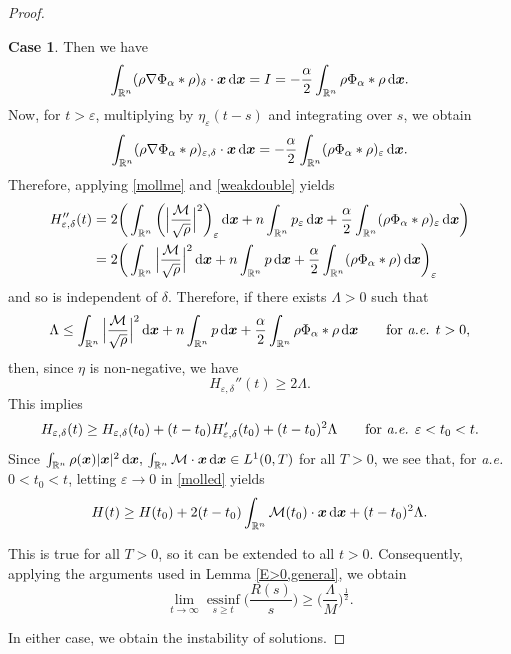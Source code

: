 \documentclass[reqno,11pt]{amsart}
\numberwithin{equation}{section}
\theoremstyle{definition}
\newtheorem{case}{Case}
\def\dd{{\, \rm d}}
\begin{document}
\begin{proof}
\begin{case}
Then we have 
$$
\int_{\mathbb{R}^n}(\rho\nabla\Phi_\alpha\ast\rho)_{{\delta}} \cdot \boldsymbol{x}\dd \boldsymbol{x}
=I=-\frac{\alpha}{2}\int_{\mathbb{R}^n}\rho\Phi_\alpha\ast\rho\dd \boldsymbol{x}.
$$
Now, for $t > {\varepsilon}$, multiplying by $\eta_{\varepsilon}(t-s)$ and integrating over $s$, we obtain
 $$\int_{\mathbb{R}^n}(\rho\nabla\Phi_\alpha\ast\rho)_{{\varepsilon},{\delta}} \cdot \boldsymbol{x}\dd \boldsymbol{x}=-\frac{\alpha}{2}\int_{\mathbb{R}^n}(\rho\Phi_\alpha\ast\rho)_{\varepsilon}\dd \boldsymbol{x}.$$
 Therefore, applying \eqref{mollme} and \eqref{weakdouble} yields
 \[
 \begin{split}
 H_{{\varepsilon},{\delta}}''(t) & =2\bigg(\int_{\mathbb{R}^n} \bigg ( \Big| \frac{\mathcal{M}}{\sqrt{\rho}} \Big|^2 \bigg )_{{\varepsilon}} \dd \boldsymbol{x}+n\int_{\mathbb{R}^n}p_{{\varepsilon}}\dd \boldsymbol{x} + \frac{\alpha}{2}\int_{\mathbb{R}^n}(\rho\Phi_\alpha\ast\rho)_{\varepsilon}\dd \boldsymbol{x}\bigg) \\
 & = 2\bigg(\int_{\mathbb{R}^n} \Big| \frac{\mathcal{M}}{\sqrt{\rho}} \Big|^2 \dd \boldsymbol{x}+n\int_{\mathbb{R}^n}p\dd \boldsymbol{x} + \frac{\alpha}{2}\int_{\mathbb{R}^n}(\rho\Phi_\alpha\ast\rho)\dd \boldsymbol{x}\bigg)_{{\varepsilon}}
 \end{split}
\]
and so is independent of ${\delta}$. 
Therefore, if there exists $\Lambda > 0$ such that
\[
 \Lambda \leq \int_{\mathbb{R}^n} \Big| \frac{\mathcal{M}}{\sqrt{\rho}} \Big|^2\dd \boldsymbol{x}+n\int_{\mathbb{R}^n}p\dd \boldsymbol{x} + \frac{\alpha}{2}\int_{\mathbb{R}^n}\rho\Phi_\alpha\ast\rho\dd \boldsymbol{x}
 \qquad\mbox{for {\it a.e.} $t > 0$},
\]
then, since $\eta$ is non-negative, we have
\[ H_{{\varepsilon},{\delta}}''(t) \geq 2\Lambda.
\]
This implies
\begin{equation}\label{molled}
    H_{{\varepsilon},{\delta}}(t) \geq H_{{\varepsilon},{\delta}}(t_0) + (t-t_0)H_{{\varepsilon},{\delta}}'(t_0) + (t - t_0)^2 \Lambda
    \qquad\mbox{for {\it a.e.} $\varepsilon < t_0 < t$}.
\end{equation}
 Since $\int_{\mathbb{R}^n}\rho(\boldsymbol{x})|\boldsymbol{x}|^2\dd \boldsymbol{x}, \,\int_{\mathbb{R}^n}\mathcal{M} \cdot \boldsymbol{x}\dd \boldsymbol{x} \in L^1(0,T)$ for all $T>0$, 
 we see that, for {\it a.e.} $0 < t_0 < t$, letting $\varepsilon \to 0$ in \eqref{molled} yields
\[
H(t) \geq H(t_0) + 2 (t-t_0)\int_{\mathbb{R}^n} \mathcal{M}(t_0) \cdot \boldsymbol{x} \dd \boldsymbol{x} 
+ (t - t_0)^2 \Lambda.
\]

This is true for all $T > 0$, so it can be extended to all $t > 0$. 
Consequently, applying the arguments used in Lemma \ref{E>0,general}, we obtain 
\[
\lim_{t \to \infty} \underset{s \geq t}{\text{ess}\inf}\Big(\frac{R(s)}{s}\Big)
 \geq \Big(\frac{\Lambda}{M}\Big)^{\frac{1}{2}}.
\]
\end{case}
In either case, we obtain the instability of solutions.
\end{proof}
\setcounter{case}{0}
\end{document}
